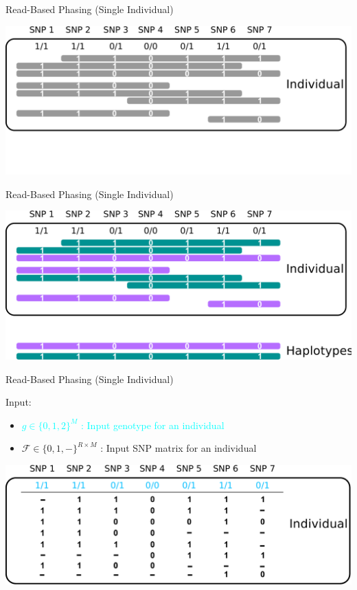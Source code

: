\documentclass[notes=hide]{beamer}
\newcommand{\F}{\mathcal{F}}
\begin{document}
\begin{frame}{Read-Based Phasing (Single Individual)}
\begin{center}
\includegraphics[scale=.35]{figs/sih-phasing-complete1.pdf}
\end{center}
\end{frame}

\begin{frame}{Read-Based Phasing (Single Individual)}
	\begin{center}
		\includegraphics[scale=.35]{figs/sih-phasing-complete-haplo.pdf}		
	\end{center}
\end{frame}

\begin{frame}{Read-Based Phasing (Single Individual)}
\begin{center}
\begin{block}{Input: }
				\begin{itemize}
										\item \textcolor{cyan}{$g \in \{0,1,2\}^M$ : Input genotype for an individual }
					\item $\F \in \{0,1,-\}^{R\times M}$ : Input SNP matrix for an individual 

				\end{itemize}
	\end{block}
	\bigskip
	\includegraphics[scale=0.35]{figs/sih-phasing-complete-matrix.pdf}%
\end{center}
\end{frame}
\end{document}
